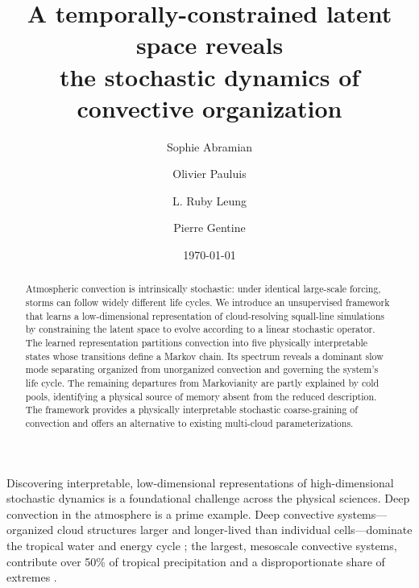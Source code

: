 \documentclass[
    aps,
    prl,
    reprint,
    superscriptaddress,
    amsmath,amssymb,
    floatfix,
    nofootinbib
]{revtex4-2}
\begin{document}
\title{A temporally-constrained latent space reveals \\ 
the stochastic dynamics of convective organization}

\author{Sophie Abramian}

\author{Olivier Pauluis}

\author{L. Ruby Leung}


\author{Pierre Gentine}




\date{\today}

\begin{abstract}
Atmospheric convection is intrinsically stochastic: under identical large-scale forcing, storms can follow widely different life cycles. We introduce an unsupervised framework that learns a low-dimensional representation of cloud-resolving squall-line simulations by constraining the latent space to evolve according to a linear stochastic operator. The learned representation partitions convection into five physically interpretable states whose transitions define a Markov chain. Its spectrum reveals a dominant slow mode separating organized from unorganized convection and governing the system's life cycle. The remaining departures from Markovianity are partly explained by cold pools, identifying a physical source of memory absent from the reduced description. The framework provides a physically interpretable stochastic coarse-graining of convection and offers an alternative to existing multi-cloud parameterizations.
\end{abstract}

\maketitle

Discovering interpretable, low-dimensional representations of high-dimensional stochastic dynamics is a foundational challenge across the physical sciences. Deep convection in the atmosphere is a prime example. Deep convective systems---organized cloud structures larger and longer-lived than individual cells---dominate the tropical water and energy cycle \cite{houze2004mesoscale, chakraborty2023overview}; the largest, mesoscale convective systems, contribute over 50\% of tropical precipitation and a disproportionate share of extremes \cite{roca2020extreme, feng2024mesoscale, feng2023mesoscale}.
\end{document}
